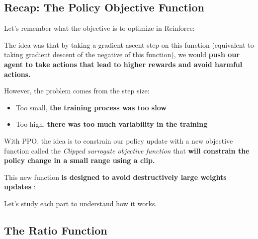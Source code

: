\documentclass[11pt,a4paper]{article}
\begin{document}
\subsection{Recap: The Policy Objective Function}\label{recap-the-policy-objective-function}

Let's remember what the objective is to optimize in Reinforce:


The idea was that by taking a gradient ascent step on this function (equivalent to taking gradient descent of the negative of this function), we would \textbf{push our agent to take actions that lead to higher rewards and avoid harmful actions.}

However, the problem comes from the step size:

\begin{itemize}
\tightlist
\item
  Too small, \textbf{the training process was too slow}
\item
  Too high, \textbf{there was too much variability in the training}
\end{itemize}

With PPO, the idea is to constrain our policy update with a new objective function called the \emph{Clipped surrogate objective function} that \textbf{will constrain the policy change in a small range using a clip.}

This new function \textbf{is designed to avoid destructively large weights updates} :


Let's study each part to understand how it works.

\subsection{The Ratio Function}\label{the-ratio-function}

\end{document}

